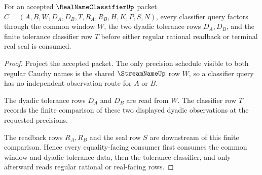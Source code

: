 \begin{theorem}
\label{thm:real-name-classifier-tolerance-obligation}
For an accepted $\RealNameClassifierUp$ packet $C=(A,B,W,D_A,D_B,T,R_A,R_B,H,K,P,S,N)$, every classifier query factors through the common window $W$, the two dyadic tolerance rows $D_A,D_B$, and the finite tolerance classifier row $T$ before either regular rational readback or terminal real seal is consumed.
\end{theorem}
\begin{proof}
Project the accepted packet. The only precision schedule visible to both regular Cauchy names is the shared $\StreamNameUp$ row $W$, so a classifier query has no independent observation route for $A$ or $B$.

The dyadic tolerance rows $D_A$ and $D_B$ are read from $W$. The classifier row $T$ records the finite comparison of these two displayed dyadic observations at the requested precisions.

The readback rows $R_A,R_B$ and the seal row $S$ are downstream of this finite comparison. Hence every equality-facing consumer first consumes the common window and dyadic tolerance data, then the tolerance classifier, and only afterward reads regular rational or real-facing rows.
\end{proof}

